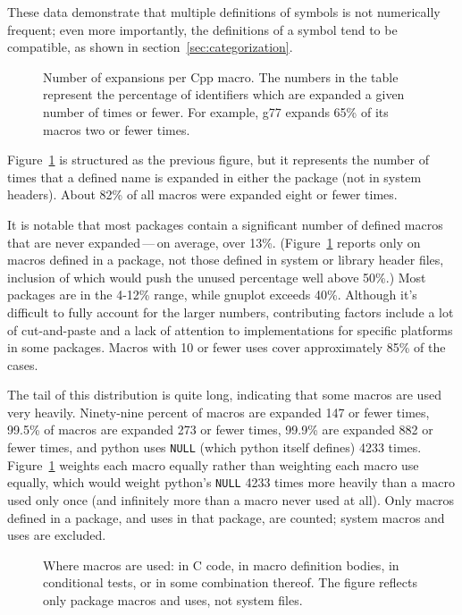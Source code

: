 \documentclass[11pt]{article}
\newcommand{\pkg}[1]{\textsf{#1}}
\begin{document}
These data demonstrate that multiple definitions of symbols is not
numerically frequent; even more importantly, the definitions of a symbol
tend to be compatible, as shown in section~\ref{sec:categorization}.


\begin{figure}
\centerline{}
\caption{Number of expansions per Cpp macro.  The numbers in the
  table represent the percentage of identifiers which are expanded a given
  number of times or fewer.  For example, \pkg{g77} expands 65\% of its
  macros two or fewer times.}
\label{fig:freq-use}
\end{figure}

Figure~\ref{fig:freq-use} is structured as the previous figure, but it
represents the number of times that a defined name is expanded in either
the package (not in system headers).  About 82\% of all macros were
expanded eight or fewer times.

It is notable that most packages contain a significant number of defined
macros that are never expanded\,---\,on average, over 13\%.
(Figure~\ref{fig:freq-use} reports only on macros defined in a package, not
those defined in system or library header files, inclusion of which would
push the unused percentage well above 50\%.)  Most packages are in the
4-12\% range, while \pkg{gnuplot} exceeds 40\%.  Although it's difficult to fully
account for the larger numbers, contributing factors include a lot of
cut-and-paste and a lack of attention to implementations for specific
platforms in some packages.  Macros with 10 or fewer uses cover
approximately 85\% of the cases.

The tail of this distribution is quite long, indicating that some macros
are used very heavily.  Ninety-nine percent of macros are expanded 147 or fewer
times, 99.5\% of macros are expanded 273 or fewer times, 99.9\% are
expanded 882 or fewer times, and \pkg{python} uses {\tt NULL} (which \pkg{python}
itself defines) 4233 times.  Figure~\ref{fig:freq-use} weights each macro
equally rather than weighting each macro use equally, which would weight
\pkg{python}'s {\tt NULL} 4233 times more heavily than a macro used only once
(and infinitely more than a macro never used at all).  Only macros defined
in a package, and uses in that package, are counted; system macros and uses
are excluded.


\begin{figure}
\centerline{}
\caption{Where macros are used: in C code, in macro definition bodies, in
  conditional tests, or in some combination thereof.  The figure reflects
  only package macros and uses, not system files.}
\label{fig:where-used}
\end{figure}
\end{document}
